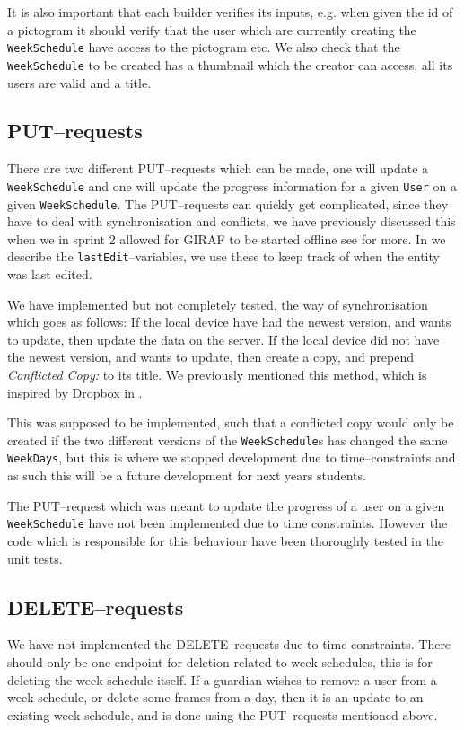 It is also important that each builder verifies its inputs, e.g. when given the id of a pictogram it should verify that the user which are currently creating the \texttt{WeekSchedule} have access to the pictogram etc.
We also check that the \texttt{WeekSchedule} to be created has a thumbnail which the creator can access, all its users are valid and a title.

\subsection{PUT--requests}
There are two different PUT--requests which can be made, one will update a \texttt{WeekSchedule} and one will update the progress information for a given \texttt{User} on a given \texttt{WeekSchedule}.
The PUT--requests can quickly get complicated, since they have to deal with synchronisation and conflicts, we have previously discussed this when we in sprint 2 allowed for GIRAF to be started offline see  for more.
In  we describe the \texttt{lastEdit}--variables, we use these to keep track of when the entity was last edited.

We have implemented but not completely tested, the way of synchronisation which goes as follows:
If the local device have had the newest version, and wants to update, then update the data on the server.
If the local device did not have the newest version, and wants to update, then create a copy, and prepend \textit{Conflicted Copy:} to its title.
We previously mentioned this method, which is inspired by Dropbox in .

This was supposed to be implemented, such that a conflicted copy would only be created if the two different versions of the \texttt{WeekSchedule}s has changed the same \texttt{WeekDays}, but this is where we stopped development due to time--constraints and as such this will be a future development for next years students.

The PUT--request which was meant to update the progress of a user on a given \texttt{WeekSchedule} have not been implemented due to time constraints.
However the code which is responsible for this behaviour have been thoroughly tested in the unit tests.

\subsection{DELETE--requests}
We have not implemented the DELETE--requests due to time constraints.
There should only be one endpoint for deletion related to week schedules, this is for deleting the week schedule itself.
If a guardian wishes to remove a user from a week schedule, or delete some frames from a day, then it is an update to an existing week schedule, and is done using the PUT--requests mentioned above.